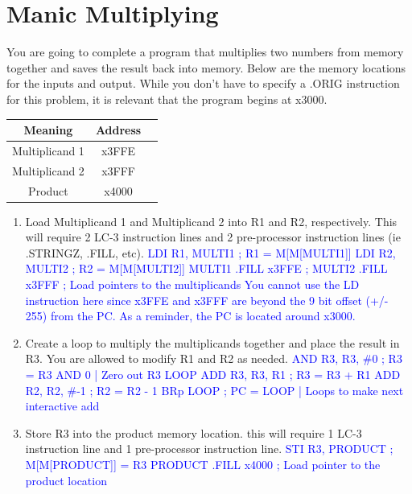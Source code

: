 \documentclass{article}
\begin{document}
    \section{Manic Multiplying}
    You are going to complete a program that multiplies two numbers from memory together and saves the result back into memory. Below are the memory locations for the inputs and output. While you don't have to specify a .ORIG instruction for this problem, it is relevant that the program begins at x3000.
    \begin{table}[h]
        \centering
        \begin{tabular}{|c|c|c|}
        \hline
        \textbf{Meaning} & \textbf{Address} \\\hline
        Multiplicand 1 & x3FFE \\\hline
        Multiplicand 2 & x3FFF \\\hline
        Product & x4000 \\
        \hline
        \end{tabular}
        \end{table}
    \begin{enumerate}[label=(\alph*), itemsep = 50pt]
        \item Load Multiplicand 1 and Multiplicand 2 into R1 and R2, respectively. This will require 2 LC-3 instruction lines and 2 pre-processor instruction lines (ie .STRINGZ, .FILL, etc).
        \newline \newline \textcolor{blue} {LDI R1, MULTI1 ; R1 = M[M[MULTI1]] \newline
        LDI R2, MULTI2 ; R2 = M[M[MULTI2]] \newline
        MULTI1 .FILL x3FFE ; \newline
        MULTI2 .FILL x3FFF ; Load pointers to the multiplicands \newline \newline
        You cannot use the LD instruction here since x3FFE and x3FFF are beyond the 9 bit offset (+/- 255) from the PC. As a reminder, the PC is located around x3000.}
        \item Create a loop to multiply the multiplicands together and place the result in R3.  You are allowed to modify R1 and R2 as needed.
        \newline \newline \textcolor{blue} {
        AND R3, R3, \#0 ; R3 = R3 AND 0 | Zero out R3 \newline
        LOOP ADD R3, R3, R1 ; R3 = R3 + R1 \newline
        ADD R2, R2, \#-1 ; R2 = R2 - 1 \newline
        BRp LOOP ; PC = LOOP | Loops to make next interactive add
        }
        \item Store R3 into the product memory location. this will require 1 LC-3 instruction line and 1 pre-processor instruction line.
        \newline \newline \textcolor{blue} {
        STI R3, PRODUCT ; M[M[PRODUCT]] = R3 \newline
        PRODUCT .FILL x4000 ; Load pointer to the product location
        }
    \end{enumerate}
\end{document}
